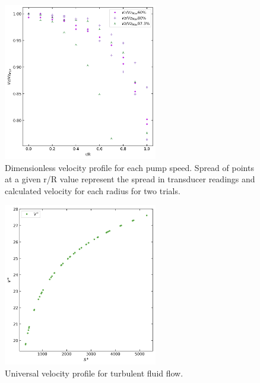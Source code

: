 \documentclass{article}
\begin{document}
\begin{figure}[H]
\centering
\includegraphics[width=0.6\textwidth]{images/0_plot.png}
\caption{\label{fig2}Dimensionless velocity profile for each pump speed. Spread of points at a given r/R value represent the spread in transducer readings and calculated velocity for each radius for two trials.}
\end{figure}

\begin{figure}[H]
\centering
\includegraphics[width=0.6\textwidth]{images/2_plot.png}
\caption{\label{fig2} Universal velocity profile for turbulent fluid flow.}
\end{figure}
\end{document}
